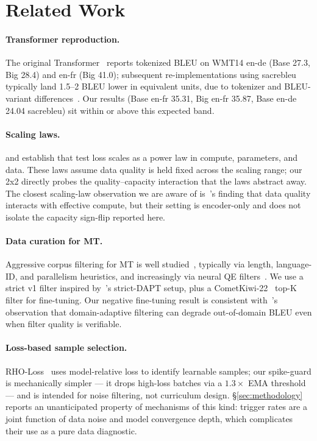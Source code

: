 \section{Related Work}
\label{sec:related}

\paragraph{Transformer reproduction.}
The original Transformer~\cite{vaswani2017attention} reports tokenized BLEU on WMT14 en-de (Base 27.3, Big 28.4) and en-fr (Big 41.0); subsequent re-implementations using sacrebleu~\cite{post2018call} typically land 1.5--2 BLEU lower in equivalent units, due to tokenizer and BLEU-variant differences~\cite{post2018call}. Our results (Base en-fr 35.31, Big en-fr 35.87, Base en-de 24.04 sacrebleu) sit within or above this expected band.

\paragraph{Scaling laws.}
\cite{kaplan2020scaling} and \cite{hoffmann2022chinchilla} establish that test loss scales as a power law in compute, parameters, and data. These laws assume data quality is held fixed across the scaling range; our 2x2 directly probes the quality--capacity interaction that the laws abstract away. The closest scaling-law observation we are aware of is~\cite{tay2022scaling}'s finding that data quality interacts with effective compute, but their setting is encoder-only and does not isolate the capacity sign-flip reported here.

\paragraph{Data curation for MT.}
Aggressive corpus filtering for MT is well studied~\cite{koehn2018findings, junczys2019cscope}, typically via length, language-ID, and parallelism heuristics, and increasingly via neural QE filters~\cite{batheja2022qe}. We use a strict v1 filter inspired by~\cite{gururangan2020dont}'s strict-DAPT setup, plus a CometKiwi-22~\cite{rei2022cometkiwi} top-K filter for fine-tuning. Our negative fine-tuning result is consistent with~\cite{junczys2019cscope}'s observation that domain-adaptive filtering can degrade out-of-domain BLEU even when filter quality is verifiable.

\paragraph{Loss-based sample selection.}
RHO-Loss~\cite{mindermann2022prioritized} uses model-relative loss to identify learnable samples; our spike-guard is mechanically simpler --- it drops high-loss batches via a $1.3\times$ EMA threshold --- and is intended for noise filtering, not curriculum design. \S\ref{sec:methodology} reports an unanticipated property of mechanisms of this kind: trigger rates are a joint function of data noise and model convergence depth, which complicates their use as a pure data diagnostic.
